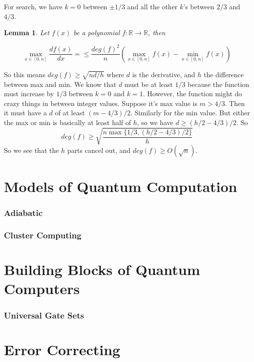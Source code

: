 \documentclass[12pt]{article}
\newtheorem{lemma}[theorem]{Lemma}
\begin{document}

For search, we have $k=0$ between $\pm 1/3$ and all the other $k$'s between $2/3$ and $4/3$. 

\begin{lemma}
Let $f(x)$ be a polynomial $f:\mathbb{R}\rightarrow\mathbb{R}$, then

$$\max_{x\in[0,n]}\dfrac{df(x)}{dx}=\leq \dfrac{deg(f)^2}{n}(\max_{x\in[0,n]}f(x)-\min_{x\in[0,n]}f(x))$$
\end{lemma}
So this means $deg(f)\geq\sqrt{nd/h}$ where $d$ is the derivative, and $h$ the difference between max and min.
 We know that $d$ must be at least $1/3$ because the function must increase by $1/3$ between $k=0$ and $k=1$.
 However, the function might do crazy things in between integer values. Suppose it's max value is $m>4/3$. Then it
 must have a $d$ of at least $(m-4/3)/2$. Similarly for the min value. But either the max or min is basically at least half
 of $h$, so we have $d\geq(h/2-4/3)/2$. So 
$$deg(f)\geq\sqrt{\frac{n\max\{1/3,(h/2-4/3)/2\}}{h}}$$
So we see that the $h$ parts cancel out, and $deg(f)\geq O(\sqrt{n})$. 





\part{Models of Quantum Computation}
\setcounter{section}{0}
\section{Adiabatic}

\setcounter{section}{0}
\section{Cluster Computing}


\part{Building Blocks of Quantum Computers}
\setcounter{section}{0}
\section{Universal Gate Sets}

\part{Error Correcting}
\end{document}
